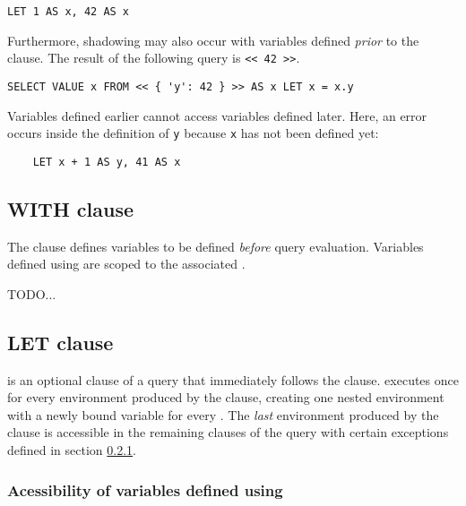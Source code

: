 \begin{lstlisting}
LET 1 AS x, 42 AS x 
\end{lstlisting}

\noindent Furthermore, shadowing may also occur with variables defined
\emph{prior} to the  clause.  The result of the
following query is \lstinline{<< 42 >>}.

\begin{lstlisting}
SELECT VALUE x FROM << { 'y': 42 } >> AS x LET x = x.y
\end{lstlisting} 

\noindent Variables defined earlier  cannot access variables defined
later.  Here, an error occurs inside the definition of \lstinline{y} because
\lstinline{x} has not been defined yet:

\begin{lstlisting}
    LET x + 1 AS y, 41 AS x 
\end{lstlisting}

\subsection{WITH clause}

The  clause defines variables to be defined \emph{before} query
evaluation. Variables defined using  are scoped to the associated
.

\bigskip

TODO...

\subsection{LET clause} 
\label{sec:let-clause}

 is an optional clause of a  query that immediately follows
the  clause.  executes once for every environment produced by
the  clause, creating one nested environment with a newly bound
variable for every . The \emph{last} environment produced by the
 clause is accessible in the remaining clauses of the  query
with certain exceptions defined in section
\ref*{sec:let-variable-accessibility}.

\subsubsection{Acessibility of variables defined using }
\label{sec:let-variable-accessibility}

